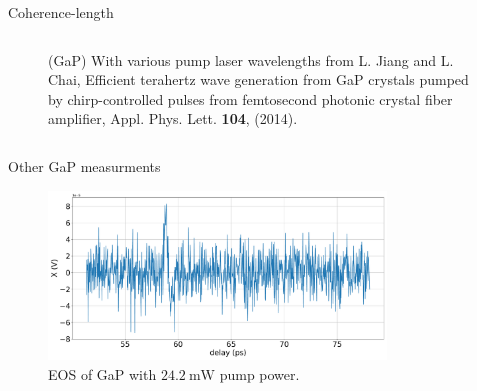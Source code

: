 \documentclass[aspectratio=1610, 9pt]{beamer}
\begin{document}
\begin{frame}{Coherence-length}
\begin{center}
\begin{columns}
\begin{column}{.4\textwidth}
\begin{figure}
      \caption{\tiny{\textcolor{tugreen}{(GaP) With various pump laser wavelengths} from L. Jiang and L. Chai, Efficient terahertz wave generation from GaP crystals pumped by chirp-controlled pulses from femtosecond photonic crystal fiber amplifier,  Appl. Phys. Lett. \textbf{104}, (2014)\nocite{GaP_coherence_length}.}}
    \end{figure}
    \end{column}
  \end{columns}
\end{center} 
\end{frame}

\begin{frame}{Other GaP measurments}
  \begin{figure}
    \includegraphics[width=0.8\textwidth]{images/GaP14_20_20normalX.pdf}
    \caption{\textcolor{tugreen}{EOS} of GaP with $\SI{24.2}{\milli\W}$ pump power.}
  \end{figure}
\end{frame}
\end{document}
